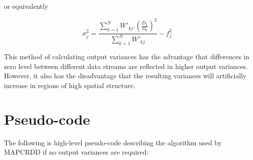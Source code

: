 \begin{enumerate}
or equivalently

\begin{equation}
\sigma^{2}_{j}=\frac{\sum_{k=1}^{N}W\prime_{kj}.(\frac{D_{k}}{\Omega_{k}})^{2}}
{\sum_{k=1}^{N}W\prime_{kj}} - f_{j}^2
\label {EQ:SIGMAJ2}
\end{equation}

This method of calculating output variances has the advantage that differences
in zero level between different data streams are reflected in higher output
variances. However, it also has the disadvantage that the resulting variances
will artificially increase in regions of high spatial structure.

\end{enumerate}

\section{Pseudo-code}
The following is high-level pseudo-code describing the algorithm used by MAPCRDD
if no output variances are required:

